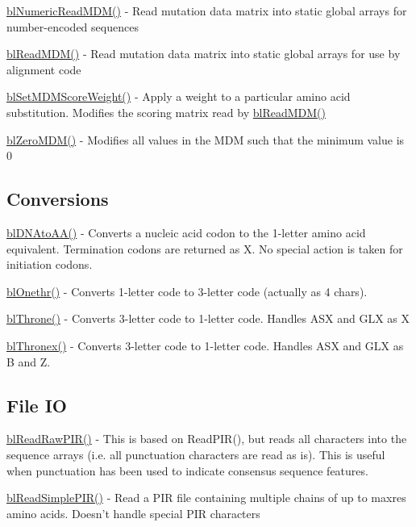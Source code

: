 \begin{DoxyItemize}
\item \hyperlink{_numeric_align_8c_af3438f88a5286d057de168f03e146703}{bl\-Numeric\-Read\-M\-D\-M()} -\/ Read mutation data matrix into static global arrays for number-\/encoded sequences
\item \hyperlink{align_8c_a7427990ccc2bc14bf3e1a1797a1aaba7}{bl\-Read\-M\-D\-M()} -\/ Read mutation data matrix into static global arrays for use by alignment code
\item \hyperlink{align_8c_a543c1d8afe579c1d3ebf03c4522f8554}{bl\-Set\-M\-D\-M\-Score\-Weight()} -\/ Apply a weight to a particular amino acid substitution. Modifies the scoring matrix read by \hyperlink{align_8c_a7427990ccc2bc14bf3e1a1797a1aaba7}{bl\-Read\-M\-D\-M()}
\item \hyperlink{align_8c_ad774c0d240bcf9902340a66c2336658e}{bl\-Zero\-M\-D\-M()} -\/ Modifies all values in the M\-D\-M such that the minimum value is 0
\end{DoxyItemize}

\subsection*{Conversions }


\begin{DoxyItemize}
\item \hyperlink{_d_n_ato_a_a_8c_ae68acfc61d30bed5ecfdaf4422c70f87}{bl\-D\-N\-Ato\-A\-A()} -\/ Converts a nucleic acid codon to the 1-\/letter amino acid equivalent. Termination codons are returned as X. No special action is taken for initiation codons.
\item \hyperlink{seq_8h_ae549d85acf85ad5233ec378101033e8b}{bl\-Onethr()} -\/ Converts 1-\/letter code to 3-\/letter code (actually as 4 chars).
\item \hyperlink{seq_8h_a29e50e2e8ab3aa15ab9e05e81d2274ab}{bl\-Throne()} -\/ Converts 3-\/letter code to 1-\/letter code. Handles A\-S\-X and G\-L\-X as X
\item \hyperlink{seq_8h_ad5f101649d4acff71295dd407310d194}{bl\-Thronex()} -\/ Converts 3-\/letter code to 1-\/letter code. Handles A\-S\-X and G\-L\-X as B and Z.
\end{DoxyItemize}

\subsection*{File I\-O }


\begin{DoxyItemize}
\item \hyperlink{_read_raw_p_i_r_8c_a30bfed19b661389a331406432e9dfc59}{bl\-Read\-Raw\-P\-I\-R()} -\/ This is based on Read\-P\-I\-R(), but reads all characters into the sequence arrays (i.\-e. all punctuation characters are read as is). This is useful when punctuation has been used to indicate consensus sequence features.
\item \hyperlink{_read_simple_p_i_r_8c_ad246bc81a152dd498cbfd579d9f7b901}{bl\-Read\-Simple\-P\-I\-R()} -\/ Read a P\-I\-R file containing multiple chains of up to maxres amino acids. Doesn't handle special P\-I\-R characters
\end{DoxyItemize}

